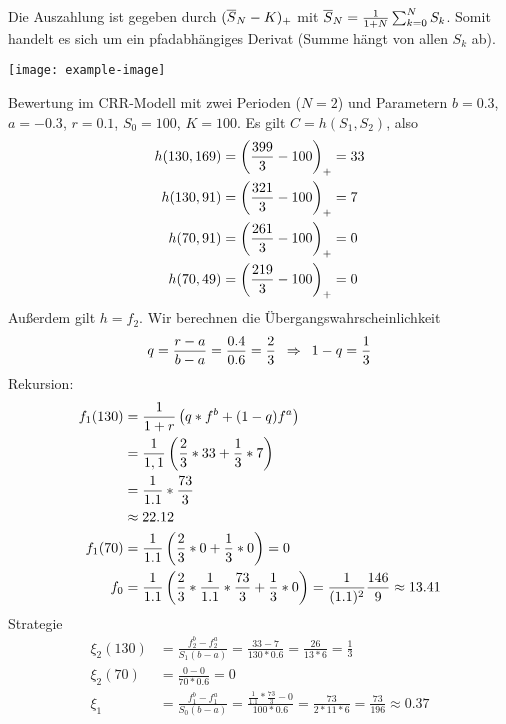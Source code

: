 \begin{*beispiel}
	Die Auszahlung ist gegeben durch $(\overline{S}_N - K)_+$ mit $\overline{S}_N = \frac{1}{1+N} \sum_{k=0}^{N} S_k$. Somit handelt es sich um ein pfadabhängiges Derivat (Summe hängt von allen $S_k$ ab). 
	
	\begin{center}
		\texttt{[image: example-image]}
	\end{center}

	Bewertung im CRR-Modell mit zwei Perioden ($N=2$) und Parametern $b = 0.3$, $a = -0.3$, $r=0.1$, $S_0 = 100$, $K=100$.
		Es gilt $C = h(S_1, S_2)$, also
	\begin{align*}
		h(130,169) &= \left( \frac{399}{3} - 100 \right)_+ = 33 \\
		h(130,91)  &= \left( \frac{321}{3} - 100 \right)_+ = 7 \\
		h(70, 91)  &= \left( \frac{261}{3} - 100 \right)_+ = 0 \\
		h(70, 49)  &= \left( \frac{219}{3} - 100 \right)_+ = 0 \\
	\end{align*} 
	Außerdem gilt $h = f_2$. Wir berechnen die Übergangswahrscheinlichkeit
	\begin{equation*}
		q = \frac{r-a}{b-a} = \frac{0.4}{0.6} = \frac{2}{3} \enskip \Rightarrow \enskip 1 - q = \frac{1}{3}
	\end{equation*}
	Rekursion:
	\begin{align*}
		f_1(130) &= \frac{1}{1+r} \left( q * f^b + (1-q) f^a \right) \\
		&= \frac{1}{1,1} \left( \frac{2}{3} * 33 + \frac{1}{3} * 7 \right) \\
		&= \frac{1}{1.1} * \frac{73}{3} \\
		&\approx 22.12 \\
		f_1(70) &= \frac{1}{1.1} \left( \frac{2}{3} * 0 + \frac{1}{3} * 0 \right) = 0 \\
		f_0 &= \frac{1}{1.1} \left( \frac{2}{3} * \frac{1}{1.1} * \frac{73}{3} + \frac{1}{3} * 0 \right) = \frac{1}{(1.1)^2} \frac{146}{9} \approx 13.41 
	\end{align*}
	Strategie
	\begin{align*}
		\xi_2(130) &= \frac{f_2^b - f_2^a}{S_1 (b-a)} = \frac{33 - 7}{130 * 0.6} = \frac{26}{13*6} = \frac{1}{3} \\
		\xi_2(70) &= \frac{0-0}{70 * 0.6} = 0 \\
		\xi_1 &= \frac{f_1^b - f_1^a}{S_0 (b-a)} = \frac{\frac{1}{1.1} * \frac{73}{3} - 0}{100 * 0.6} = \frac{73}{2*11*6} = \frac{73}{196} \approx 0.37
	\end{align*}
\end{*beispiel}


